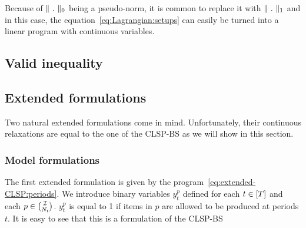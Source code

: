Because of $\norm{\ .\ }_0$ being a pseudo-norm, it is common to replace it with $\norm{\ .\ }_1$ and in this case, the equation~\eqref{eq:Lagrangian:setups} can easily be turned into a linear program with continuous variables.




\subsection{Valid inequality}
\label{sec:PDP:deterministic:theoretical-results:valid-inequality}





\subsection{Extended formulations}
\label{sec:PDP:deterministic:theoretical-results:extended-formulations}


Two natural extended formulations come in mind. Unfortunately, their continuous relaxations are equal to the one of the CLSP-BS as we will show in this section.



\subsubsection{Model formulations}

The first extended formulation is given by the program~\eqref{eq:extended-CLSP:periods}.
We introduce binary variables $y_t^p$ defined for each $t\in\range{\horizon}$ and each $p\in{\mathcal{I}\choose N_t}$.
$y_t^p$ is equal to 1 if items in $p$ are allowed to be produced at periods $t$.
It is easy to see that this is a formulation of the CLSP-BS

